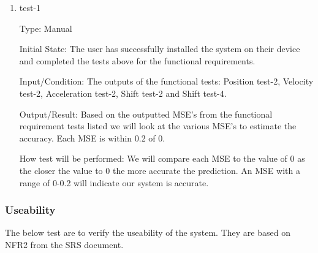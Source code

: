 \documentclass[12pt, titlepage]{article}
\begin{document}
\begin{enumerate}

\item{test-1\\}

Type: Manual
					
Initial State: The user has successfully installed the system on their device and completed the tests above for the functional requirements.
					
Input/Condition: The outputs of the functional tests: Position test-2, Velocity test-2, Acceleration test-2, Shift test-2 and Shift test-4. 
					
Output/Result: Based on the outputted MSE's from the functional requirement tests listed we will look at the various MSE's to estimate the accuracy. 
Each MSE is within 0.2 of 0.
					
How test will be performed: We will compare each MSE to the value of 0 as the closer the value to 0 the more accurate the prediction. An MSE with a range of 0-0.2 will indicate our system is accurate.

\end{enumerate}

\subsubsection{Useability}

The below test are to verify the useability of the system.
They are based on NFR2 from the SRS document.
\end{document}
